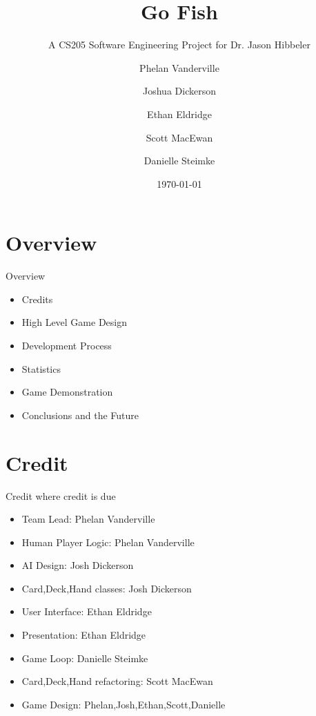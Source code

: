 \documentclass[compress, blue]{beamer}
\begin{document}
\title{Go Fish}   
\subtitle{A CS205 Software Engineering Project for Dr. Jason Hibbeler}
\author[Phelan,Josh,Ethan,Scott,Danielle]{Phelan Vanderville \and Joshua Dickerson \and Ethan Eldridge \and Scott MacEwan\and  Danielle Steimke} 
\date{\today} 



\begin{frame}
\maketitle
\end{frame}

\section{Overview}

\begin{frame}{Overview}

\begin{itemize}
\item<1>Credits
\item<2>High Level Game Design
\item<3>Development Process
\item<4>Statistics
\item<5>Game Demonstration
\item<6>Conclusions and the Future
\end{itemize}

\end{frame}

\section{Credit}

\begin{frame}{Credit where credit is due}
\begin{itemize}
\item<1>Team Lead: Phelan Vanderville
\item<1>Human Player Logic: Phelan Vanderville
\item<2>AI Design: Josh Dickerson
\item<2>Card,Deck,Hand classes: Josh Dickerson
\item<3>User Interface: Ethan Eldridge
\item<3>Presentation: Ethan Eldridge
\item<4>Game Loop: Danielle Steimke
\item<5>Card,Deck,Hand refactoring: Scott MacEwan
\item<6>Game Design: Phelan,Josh,Ethan,Scott,Danielle
\end{itemize}
\end{frame}
\end{document}
